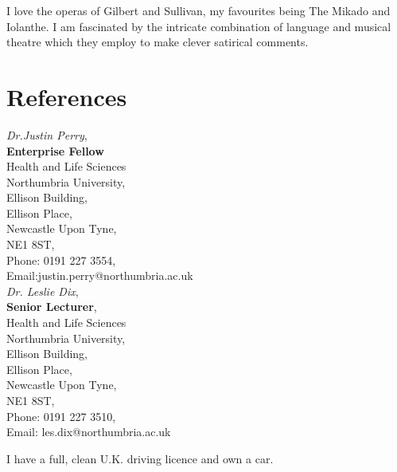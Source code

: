 \documentclass[]{friggeri-cv}
\begin{document}
I love the operas of Gilbert and Sullivan, my favourites being The Mikado and Iolanthe. I am fascinated by the intricate combination of language and musical theatre which they employ to make clever satirical comments.\\





\section{References}
\begin{multicols}{2}
\justify
\emph{Dr.Justin Perry},\\
\textbf{Enterprise Fellow}\\
Health and Life Sciences\\
Northumbria University,\\
Ellison Building,\\
Ellison Place,\\
Newcastle Upon Tyne,\\
NE1 8ST,\\
Phone: 0191 227 3554,\\
Email:justin.perry@northumbria.ac.uk\\

\emph{Dr. Leslie Dix},\\
\textbf{Senior Lecturer},\\
Health and Life Sciences\\
Northumbria University,\\
Ellison Building,\\
Ellison Place,\\
Newcastle Upon Tyne,\\
NE1 8ST,\\
Phone: 0191 227 3510,\\
Email: les.dix@northumbria.ac.uk
\end{multicols}
I have a full, clean U.K. driving licence and own a car.
\end{document}
